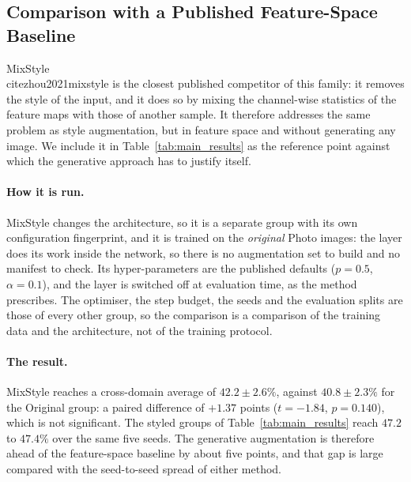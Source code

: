 ﻿%
\subsection{Comparison with a Published Feature-Space Baseline}
\label{sec:mixstyle}

MixStyle~\\cite{zhou2021mixstyle} is the closest published competitor of this
family: it removes the style of the input, and it does so by mixing the
channel-wise statistics of the feature maps with those of another sample.
It therefore addresses the same problem as style augmentation, but in
feature space and without generating any image. We include it in
Table~\ref{tab:main_results} as the reference point against which the
generative approach has to justify itself.

\paragraph{How it is run.}
MixStyle changes the architecture, so it is a separate group with its own
configuration fingerprint, and it is trained on the \emph{original} Photo
images: the layer does its work inside the network, so there is no
augmentation set to build and no manifest to check. Its hyper-parameters
are the published defaults ($p = 0.5$, $\alpha = 0.1$), and the layer is
switched off at evaluation time, as the method prescribes. The optimiser,
the step budget, the seeds and the evaluation splits are those of every
other group, so the comparison is a comparison of the training data and
the architecture, not of the training protocol.

\paragraph{The result.}
MixStyle reaches a cross-domain average of $42.2\pm2.6\%$, against
$40.8\pm2.3\%$ for the Original group: a paired difference of $+1.37$
points ($t = -1.84$, $p = 0.140$), which is not significant. The styled
groups of Table~\ref{tab:main_results} reach $47.2$ to $47.4\%$ over the
same five seeds. The generative augmentation is therefore ahead of the
feature-space baseline by about five points, and that gap is large compared
with the seed-to-seed spread of either method.

